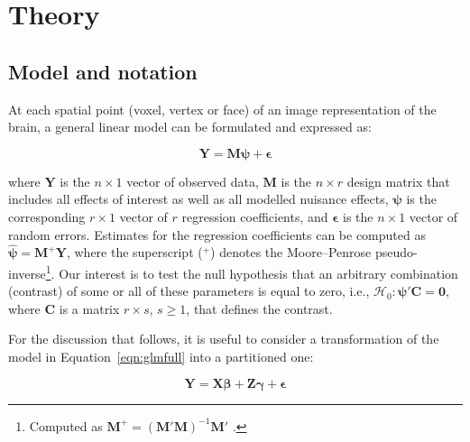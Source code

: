 \section{Theory}

\subsection{Model and notation}
\label{sec:partitioning}

At each spatial point (voxel, vertex or face) of an image representation of the brain, a general linear model can be formulated and expressed as:

\begin{equation}
\mathbf{Y} =  \mathbf{M} \boldsymbol{\psi} + \boldsymbol{\epsilon}
\label{eqn:glmfull}
\end{equation}

\noindent
where $\mathbf{Y}$ is the $n \times 1$ vector of observed data, $\mathbf{M}$ is the $n \times r$ design matrix that includes all effects of interest as well as all modelled nuisance effects, $\boldsymbol{\psi}$ is the corresponding $r \times 1$ vector of $r$ regression coefficients, and $\boldsymbol{\epsilon}$ is the $n \times 1$ vector of random errors. Estimates for the regression coefficients can be computed as $\boldsymbol{\hat{\psi}} = \mathbf{M}^{+}\mathbf{Y}$, where the superscript ($^{+}$) denotes the Moore--Penrose pseudo-inverse\footnote{Computed as $\mathbf{M}^{+}=\left(\mathbf{M}'\mathbf{M}\right)^{-1}\mathbf{M}'$ \citep{Moore1920, Penrose1955}.}. Our interest is to test the null hypothesis that an arbitrary combination (contrast) of some or all of these parameters is equal to zero, i.e., $\mathcal{H}_0 : \boldsymbol{\psi}' \mathbf{C}=\boldsymbol{0}$, where $\mathbf{C}$ is a matrix $r \times s$, $s \geqslant 1$, that defines the contrast.

For the discussion that follows, it is useful to consider a transformation of the model in Equation~\ref{eqn:glmfull} into a partitioned one:

\begin{equation}
\mathbf{Y} = \mathbf{X}\boldsymbol{\beta} + \mathbf{Z}\boldsymbol{\gamma} + \boldsymbol{\epsilon}
\end{equation}

